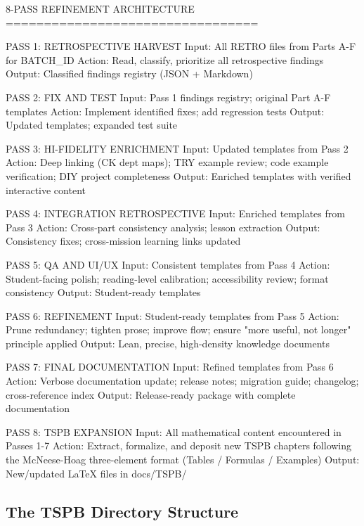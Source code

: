 \documentclass[11pt,letterpaper]{article}
\begin{document}
\begin{asciibox}
8-PASS REFINEMENT ARCHITECTURE
=================================

PASS 1: RETROSPECTIVE HARVEST
  Input: All RETRO files from Parts A-F for {BATCH\_ID}
  Action: Read, classify, prioritize all retrospective findings
  Output: Classified findings registry (JSON + Markdown)

PASS 2: FIX AND TEST
  Input: Pass 1 findings registry; original Part A-F templates
  Action: Implement identified fixes; add regression tests
  Output: Updated templates; expanded test suite

PASS 3: HI-FIDELITY ENRICHMENT
  Input: Updated templates from Pass 2
  Action: Deep linking (CK dept maps); TRY example review;
          code example verification; DIY project completeness
  Output: Enriched templates with verified interactive content

PASS 4: INTEGRATION RETROSPECTIVE
  Input: Enriched templates from Pass 3
  Action: Cross-part consistency analysis; lesson extraction
  Output: Consistency fixes; cross-mission learning links updated

PASS 5: QA AND UI/UX
  Input: Consistent templates from Pass 4
  Action: Student-facing polish; reading-level calibration;
          accessibility review; format consistency
  Output: Student-ready templates

PASS 6: REFINEMENT
  Input: Student-ready templates from Pass 5
  Action: Prune redundancy; tighten prose; improve flow;
          ensure "more useful, not longer" principle applied
  Output: Lean, precise, high-density knowledge documents

PASS 7: FINAL DOCUMENTATION
  Input: Refined templates from Pass 6
  Action: Verbose documentation update; release notes;
          migration guide; changelog; cross-reference index
  Output: Release-ready package with complete documentation

PASS 8: TSPB EXPANSION
  Input: All mathematical content encountered in Passes 1-7
  Action: Extract, formalize, and deposit new TSPB chapters
          following the McNeese-Hoag three-element format
          (Tables / Formulas / Examples)
  Output: New/updated LaTeX files in docs/TSPB/
\end{asciibox}

\subsection{The TSPB Directory Structure}
\end{document}
